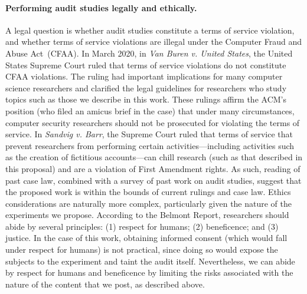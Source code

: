 \paragraph{Performing audit studies legally and ethically.}
A legal question is whether audit studies constitute a terms of service
violation,
and whether terms of service violations are illegal under the Computer Fraud
and Abuse Act~(CFAA). In March 2020, in {\em Van Buren v. United States}, the
United States Supreme Court ruled that terms of service violations do not
constitute CFAA violations. The ruling had important implications for many
computer science researchers and clarified the legal guidelines for
researchers who study topics such as those we describe in this work. These
rulings affirm the ACM's position (who filed an amicus brief in the case) that
under many circumstances, computer security researchers should not be
prosecuted for violating the terms of service. In {\em Sandvig v. Barr}, the
Supreme Court ruled that terms of service that prevent researchers from
performing certain activities---including activities such as the creation of
fictitious accounts---can chill research (such as that described in this
proposal) and are a violation of First Amendment rights. As such, reading of
past case law, combined with a survey of past work on audit studies, suggest
that the proposed work is within the bounds of current rulings
and case law.
Ethics considerations are naturally more complex, particularly given the
nature of the experiments we propose. According to the Belmont Report,
researchers should abide by several principles: (1) respect for humans; (2)
beneficence; and (3) justice. In the case of this work, obtaining informed
consent (which would fall under respect for humans) is not practical, since
doing so would expose the subjects to the experiment and taint the audit
itself. Nevertheless, we can abide by respect for humans and beneficence by
limiting the risks associated with the nature of the content that we post, as
described above.
